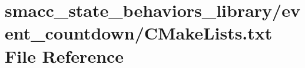 \hypertarget{state__behaviors__library_2event__countdown_2CMakeLists_8txt}{}\section{smacc\+\_\+state\+\_\+behaviors\+\_\+library/event\+\_\+countdown/\+C\+Make\+Lists.txt File Reference}
\label{state__behaviors__library_2event__countdown_2CMakeLists_8txt}
